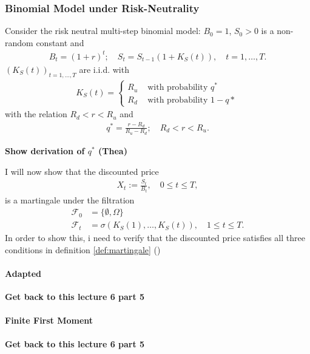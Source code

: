 \documentclass{article}
\theoremstyle{definition}
\numberwithin{equation}{section}
\newcommand{\taskcolor}{RedOrange}
\newcommand{\task}[1]{
    \begin{center}
        \colorbox{\taskcolor}{
            \textsf{
                \textbf{#1}
            }
        }
    \end{center}
}
\begin{document}
\subsubsection{Binomial Model under Risk-Neutrality}
Consider the risk neutral multi-step binomial model: $B_0 = 1$, $S_0 > 0$ is a non-random constant and
\begin{align}
    B_t = (1 + r)^t; \quad S_t = S_{t-1}(1 + K_S(t)), \quad t = 1, \ldots, T. 
\end{align}
$(K_S(t))_{t = 1, \ldots, T}$ are i.i.d. with 
\begin{align}
    K_S(t) = 
    \begin{cases}
        R_u &\text{ with probability } q^* \\
        R_d &\text{ with probability } 1-q*
    \end{cases}
\end{align}
with the relation $R_d < r < R_u$ and
\begin{align}
    q^* = \frac{r - R_d}{R_u - R_d}; \quad R_d < r < R_u.
\end{align}
\task{Show derivation of $q^*$ (Thea)}
I will now show that the discounted price
\begin{align}
    X_t := \frac{S_t}{B_t}, \quad 0 \leq t \leq T, 
\end{align}
is a martingale under the filtration
\begin{align}
    \mathscr{F}_0 &= \{ \emptyset, \Omega\} \label{eq:information_at_time_0} \\
    \mathscr{F}_t &= \sigma(K_S(1), \ldots, K_S(t)), \quad 1 \leq t \leq T. \label{eq:information_at_time_1}  
\end{align}
In order to show this, i need to verify that the discounted price satisfies all three conditions in definition \ref{def:martingale} ()
\paragraph{Adapted}
\task{Get back to this lecture 6 part 5}

\paragraph{Finite First Moment}
\task{Get back to this lecture 6 part 5}
\end{document}
